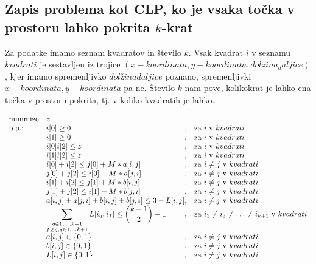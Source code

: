 \documentclass[a4paper, 11pt]{article}
\begin{document}
\subsection{Zapis problema kot CLP, ko je vsaka točka v prostoru lahko pokrita $k$-krat}
Za podatke imamo seznam kvadratov in število $k$. Vsak kvadrat $i$ v seznamu $kvadrati$ je sestavljen
iz trojice $(x-koordinata,y-koordinata,dolzina_daljice)$, kjer imamo spremenljivko $dolžina daljice$
poznano, spremenljivki $x-koordinata,y-koordinata$ pa ne. Število $k$ nam pove, kolikokrat je
lahko ena točka v prostoru pokrita, tj. v koliko kvadratih je lahko.

\begin{equation*}
    \begin{array}{ll@{}ll}
    \text{minimize}  & z &\\
    \text{p.p.:}& i[0] \geq 0 & ,  & \text{za $i$ v $kvadrati$}\\
                & i[1] \geq 0 & ,  & \text{za $i$ v $kvadrati$}\\
                & i[0] i[2] \leq z & ,  & \text{za $i$ v $kvadrati$}\\
                & i[1] i[2] \leq z & ,  & \text{za $i$ v $kvadrati$}\\
                & i[0] + i[2] \leq j[0] + M * a[i,j]& , &\text{za $i \neq j $ v $kvadrati$} \\
                & j[0] + j[2] \leq i[0] + M * a[j,i]& , &\text{za $i \neq j $ v $kvadrati$} \\
                & i[1] + i[2] \leq j[1] + M * b[i,j]& , &\text{za $i \neq j $ v $kvadrati$} \\
                & j[1] + j[2] \leq i[1] + M * b[j,i]& , &\text{za $i \neq j $ v $kvadrati$} \\
                & a[i, j] + a[j, i] + b[i, j] + b[j, i] \leq 3 + L[i,j]& , &\text{za $i \neq j $ v $kvadrati$} \\
                & \displaystyle\sum_{\substack{g \in {1,\dots , k+1}\\ f \ge g, g\in {1, \dots k+1}}} L[i_g,i_f] \leq {k+1 \choose 2} -1& , &\text{za $i_1 \neq i_2\neq \dots \neq i_{k+1} $ v $kvadrati$} \\ 
                & a[i,j] \in \{0,1\} & , &\text{za $i \neq j $ v $kvadrati$} \\
                & b[i,j] \in \{0,1\} & , &\text{za $i \neq j $ v $kvadrati$} \\
                & L[i,j] \in \{0,1\} & , &\text{za $i \neq j $ v $kvadrati$}
    \end{array}
    \end{equation*}
\end{document}
